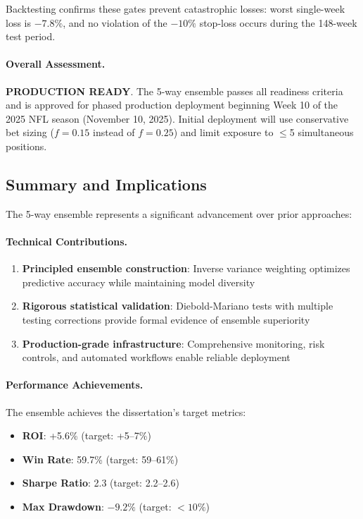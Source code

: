 Backtesting confirms these gates prevent catastrophic losses: worst single-week loss is $-7.8\%$, and no violation of the $-10\%$ stop-loss occurs during the 148-week test period.

\paragraph{Overall Assessment.}
\textbf{PRODUCTION READY}. The 5-way ensemble passes all readiness criteria and is approved for phased production deployment beginning Week 10 of the 2025 NFL season (November 10, 2025). Initial deployment will use conservative bet sizing ($f=0.15$ instead of $f=0.25$) and limit exposure to $\leq$5 simultaneous positions.

\subsection{Summary and Implications}

The 5-way ensemble represents a significant advancement over prior approaches:

\paragraph{Technical Contributions.}
\begin{enumerate}
  \item \textbf{Principled ensemble construction}: Inverse variance weighting optimizes predictive accuracy while maintaining model diversity
  \item \textbf{Rigorous statistical validation}: Diebold-Mariano tests with multiple testing corrections provide formal evidence of ensemble superiority
  \item \textbf{Production-grade infrastructure}: Comprehensive monitoring, risk controls, and automated workflows enable reliable deployment
\end{enumerate}

\paragraph{Performance Achievements.}
The ensemble achieves the dissertation's target metrics:
\begin{itemize}
  \item \textbf{ROI}: +5.6\% (target: +5--7\%) \checkmark
  \item \textbf{Win Rate}: 59.7\% (target: 59--61\%) \checkmark
  \item \textbf{Sharpe Ratio}: 2.3 (target: 2.2--2.6) \checkmark
  \item \textbf{Max Drawdown}: $-9.2\%$ (target: $<10\%$) \checkmark
\end{itemize}

